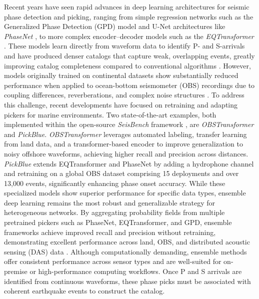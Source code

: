 \documentclass[review]{seismica}
\begin{document}
Recent years have seen rapid advances in deep learning architectures for
seismic phase detection and picking, ranging from simple regression
networks such as the Generalized Phase Detection (GPD) model
\citep{ross2018generalized} and U-Net architectures like \emph{PhaseNet}
\citep{zhu2019phasenet}, to more complex encoder--decoder models such as
the \emph{EQTransformer} \citep{mousavi2020earthquake}. These models
learn directly from waveform data to identify P- and S-arrivals and have
produced denser catalogs that capture weak, overlapping events, greatly
improving catalog completeness compared to conventional algorithms
\citep{mousavi2023machine, zhu2022endtoend}. However, models originally
trained on continental datasets show substantially reduced performance
when applied to ocean-bottom seismometer (OBS) recordings due to
coupling differences, reverberations, and complex noise structures
\citep{ruppert2022}. To address this challenge, recent developments have
focused on retraining and adapting pickers for marine environments. Two
state-of-the-art examples, both implemented within the open-source
\emph{SeisBench} framework \citep{woollam2022seisbench}, are
\emph{OBSTransformer} and \emph{PickBlue}. \emph{OBSTransformer}
\citep{niksejel2024obstransformer} leverages automated labeling,
transfer learning from land data, and a transformer-based encoder to
improve generalization to noisy offshore waveforms, achieving higher
recall and precision across distances. \emph{PickBlue}
\citep{bornstein2024pickblue} extends EQTransformer and PhaseNet by
adding a hydrophone channel and retraining on a global OBS dataset
comprising 15 deployments and over 13,000 events, significantly
enhancing phase onset accuracy. While these specialized models show
superior performance for specific data types, ensemble deep learning
remains the most robust and generalizable strategy for heterogeneous
networks. By aggregating probability fields from multiple pretrained
pickers such as PhaseNet, EQTransformer, and GPD, ensemble frameworks
achieve improved recall and precision without retraining, demonstrating
excellent performance across land, OBS, and distributed acoustic sensing
(DAS) data \citep{Yuan23, shi2025, gaete2025}. Although computationally
demanding, ensemble methods offer consistent performance across sensor
types and are well-suited for on-premise or high-performance computing
workflows. Once P and S arrivals are identified from continuous
waveforms, these phase picks must be associated with coherent earthquake
events to construct the catalog.
\end{document}
